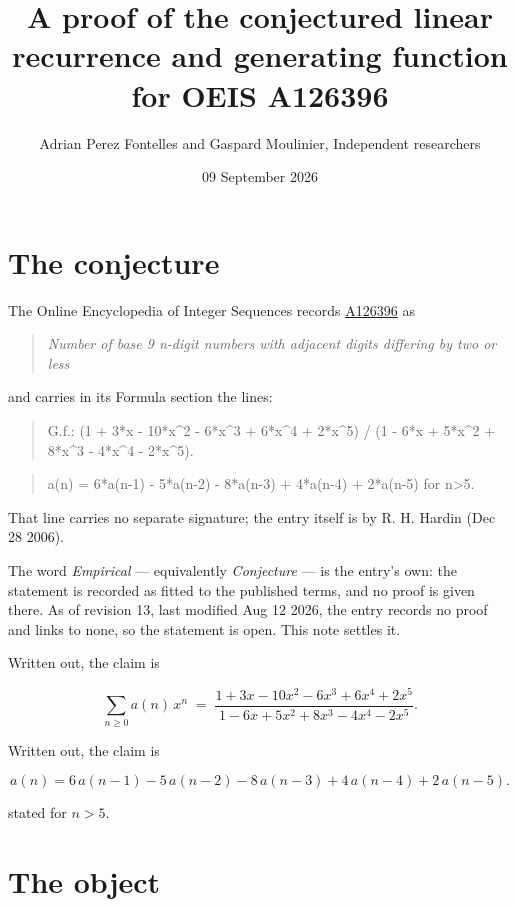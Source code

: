 \documentclass[11pt]{article}
\title{A proof of the conjectured linear recurrence and generating function for OEIS A126396}
\author{Adrian Perez Fontelles and Gaspard Moulinier, Independent researchers}
\date{09 September 2026}
\theoremstyle{definition}
\begin{document}
\maketitle
\section{The conjecture}

The Online Encyclopedia of Integer Sequences records \href{https://oeis.org/A126396}{A126396} as

\begin{quote}\itshape Number of base 9 n-digit numbers with adjacent digits differing by two or less\end{quote}

and carries in its Formula section the lines:

\begin{quote}\ttfamily G.f.: (1 + 3*x - 10*x\textasciicircum{}2 - 6*x\textasciicircum{}3 + 6*x\textasciicircum{}4 + 2*x\textasciicircum{}5) / (1 - 6*x + 5*x\textasciicircum{}2 + 8*x\textasciicircum{}3 - 4*x\textasciicircum{}4 - 2*x\textasciicircum{}5).\end{quote}

\begin{quote}\ttfamily a(n) = 6*a(n-1) - 5*a(n-2) - 8*a(n-3) + 4*a(n-4) + 2*a(n-5) for n>5.\end{quote}

That line carries no separate signature; the entry itself is by R. H. Hardin (Dec 28 2006).

The word {\itshape Empirical} --- equivalently {\itshape Conjecture} --- is the entry's own: the statement is recorded as fitted to the published terms, and no proof is given there. As of revision 13, last modified Aug 12 2026, the entry records no proof and links to none, so the statement is open. This note settles it.

Written out, the claim is

\[\sum_{n \ge 0} a(n)\,x^n \;=\; \frac{1 + 3x - 10x^{2} - 6x^{3} + 6x^{4} + 2x^{5}}{1 - 6x + 5x^{2} + 8x^{3} - 4x^{4} - 2x^{5}}.\]

Written out, the claim is

\[a(n) = 6\,a(n-1) - 5\,a(n-2) - 8\,a(n-3) + 4\,a(n-4) + 2\,a(n-5).\]

stated for $n > 5$.

\section{The object}
\end{document}
